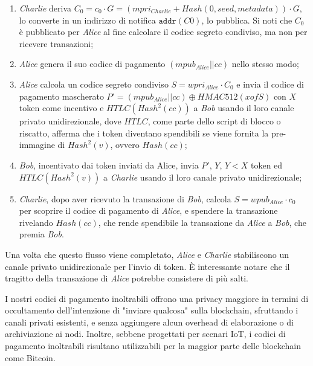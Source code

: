 \begin{enumerate}
	\item \emph{Charlie} deriva $C_0 = c_0\cdot G = (mpri_{Charlie} + Hash(0, seed, metadata))\cdot G$, lo converte in un indirizzo di notifica $\texttt{addr}(C0)$, lo pubblica. Si noti che $C_0$ è pubblicato per \emph{Alice} al fine calcolare il codice segreto condiviso, ma non per ricevere transazioni;

	\item \emph{Alice} genera il suo codice di pagamento $(mpub_{Alice}||cc)$ nello stesso modo;

	\item \emph{Alice} calcola un codice segreto condiviso $S = wpri_{Alice}\cdot C_0$ e invia il codice di pagamento mascherato $P' = (mpub_{Alice}||cc) \oplus HMAC512(xofS)$ con $X$ token come incentivo e $HTLC(Hash^2(cc))$ a \emph{Bob} usando il loro canale privato unidirezionale, dove $HTLC$, come parte dello script di blocco o riscatto, afferma che i token diventano
	      spendibili se viene fornita la pre-immagine di $Hash^2(v)$, ovvero $Hash (cc)$;

	\item \emph{Bob}, incentivato dai token inviati da Alice, invia $P'$, $Y$, $Y < X$ token ed $HTLC(Hash^2(v))$ a \emph{Charlie} usando il loro canale privato unidirezionale;

	\item \emph{Charlie}, dopo aver ricevuto la transazione di \emph{Bob}, calcola $S = wpub_{Alice}\cdot c_0$ per scoprire il codice di pagamento di \emph{Alice}, e spendere la transazione rivelando $Hash(cc)$, che rende spendibile la transazione da \emph{Alice} a \emph{Bob}, che premia \emph{Bob}.
\end{enumerate}

Una volta che questo flusso viene completato, \emph{Alice} e \emph{Charlie} stabiliscono un canale privato unidirezionale per l'invio di token. È interessante notare che il tragitto della transazione di \emph{Alice} potrebbe consistere di più salti.

I nostri codici di pagamento inoltrabili offrono una privacy maggiore in termini di occultamento dell'intenzione di "inviare qualcosa" sulla blockchain, sfruttando i canali privati esistenti, e senza aggiungere alcun overhead di elaborazione o di archiviazione ai nodi. Inoltre, sebbene progettati per scenari IoT, i codici di pagamento inoltrabili risultano utilizzabili per la maggior parte delle blockchain come Bitcoin.

